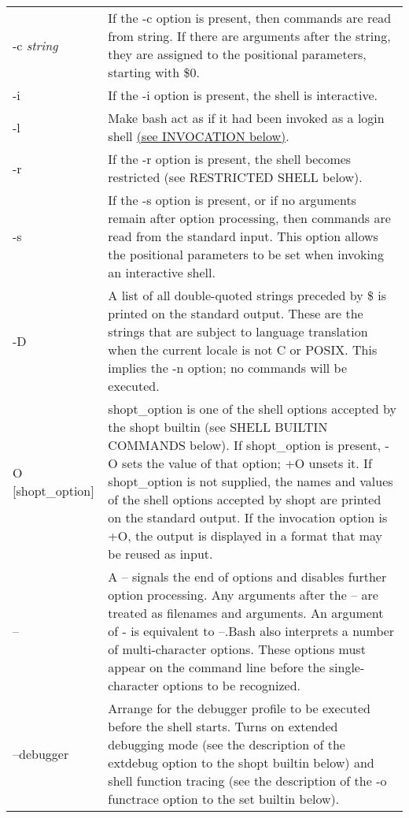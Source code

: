 \documentclass[11pt]{article}
\begin{document}
\newcommand{\ttext}[2]{\fontfamily{qcr}\selectfont#1\textit{#2}}
\noindent
\begin{longtable}{p{}p{}}
\ttext{-c }{string} & 
If the -c option is present, then commands are read from string. If there are arguments after the string, they are assigned to the positional parameters, starting with \$0. \\
\ttext{-i}{} & 
If the -i option is present, the shell is interactive. \\
\ttext{-l}{} & 
Make bash act as if it had been invoked as a login shell \hyperref[sec:invocation]{(see INVOCATION below)}. \\
\ttext{-r}{} & 
If the -r option is present, the shell becomes restricted (see RESTRICTED SHELL below). \\
\ttext{-s}{} & 
If the -s option is present, or if no arguments remain after option processing, then commands are read from the standard input. This option allows the positional parameters to be set when invoking an interactive shell. \\
\ttext{-D}{} & 
A list of all double-quoted strings preceded by \$ is printed on the standard output. These are the strings that are subject to language translation when the current locale is not C or POSIX. This implies the -n option; no commands will be executed. \\
\ttext{[-+]O [shopt\_option]}{} & 
shopt\_option is one of the shell options accepted by the shopt builtin (see SHELL BUILTIN COMMANDS below). If shopt\_option is present, -O sets the value of that option; +O unsets it. If shopt\_option is not supplied, the names and values of the shell options accepted by shopt are printed on the standard output. If the invocation option is +O, the output is displayed in a format that may be reused as input. \\
\ttext{--}{} & 
A -- signals the end of options and disables further option processing. Any arguments after the -- are treated as filenames and arguments. An argument of - is equivalent to --.\newline Bash also interprets a number of multi-character options. These options must appear on the command line before the single-character options to be recognized.\\
\ttext{--debugger}{} & 
Arrange for the debugger profile to be executed before the shell starts. Turns on extended debugging mode (see the description of the extdebug option to the shopt builtin below) and shell function tracing (see the description of the -o functrace option to the set builtin below).\\

\end{longtable}
\end{document}
